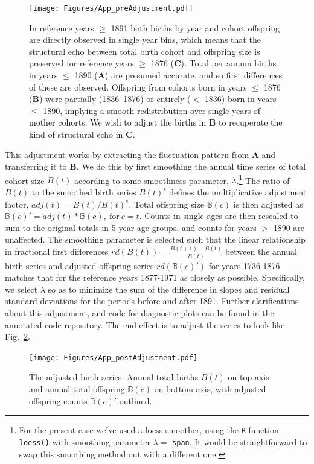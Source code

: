 \begin{figure}[ht!]
\centering
\texttt{[image: Figures/App\_preAdjustment.pdf]}
\caption{In reference years $\ge$ 1891 both births by year and cohort offspring are directly observed in single year bins, which means that the structural echo between total birth cohort and offspring size is preserved for reference years $\ge$ 1876  (\textbf{C}). Total per annum births in years $\le$ 1890 (\textbf{A}) are presumed accurate, and so first differences of these are observed. Offspring from cohorts born in years $\le$ 1876 (\textbf{B}) were partially (1836--1876) or entirely ($<$ 1836) born in years $\le$ 1890, implying a smooth redistribution over single years of mother cohorts. We wish to adjust the births in \textbf{B} to recuperate the kind of structural echo in \textbf{C}.}
\label{fig:toosmooth}
\end{figure}

This adjustment works by extracting the fluctuation pattern from \textbf{A} and transferring it to \textbf{B}. We do this by first smoothing the annual time series of total cohort size $B(t)$ according to some smoothness parameter, $\lambda$.\footnote{For the present case we've used a loess smoother, using the \texttt{R} function \texttt{loess()} with smoothing parameter $\lambda =$ \texttt{span}. It would be straightforward to swap this smoothing method out with a different one.} The ratio of $B(t)$ to the smoothed birth series $B(t)^s$ defines the multiplicative adjustment factor, $adj(t) = B(t)/B(t)^s$. Total offspring size $\mathbb{B}(c)$ is then adjusted as $\mathbb{B}(c)' = adj(t)*\mathbb{B}(c), \mathrm{~for~} c = t$. Counts in single ages are then rescaled to sum to the original totals in 5-year age groups, and counts for years $>$ 1890 are unaffected. The smoothing parameter is selected such that the linear relationship in fractional first differences $rd(B(t)) = \frac{B(t+1)-B(t)}{B(t)}$ between the annual birth series and adjusted offspring series $rd(\mathbb{B}(c)')$ for years 1736-1876 matches that for the reference years 1877-1971 as closely as possible. Specifically, we select $\lambda$ so as to minimize the sum of the difference in slopes and residual standard deviations for the periods before and after 1891. Further clarifications about this adjustment, and code for diagnostic plots can be found in the annotated code repository. The end effect is to adjust the series to look like Fig.~\ref{fig:better}.
					
					\begin{figure}[ht!]
					\centering
					\texttt{[image: Figures/App\_postAdjustment.pdf]}
					\caption{The adjusted birth series. Annual total births $B(t)$ on top axis and annual total offspring $\mathbb{B}(c)$ on bottom axis, with adjusted offspring counts $\mathbb{B}(c)'$ outlined.}
\label{fig:better}
\end{figure}


